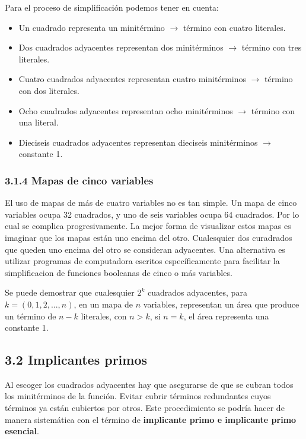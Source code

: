 \documentclass{article}
\begin{document}
Para el proceso de simplificaci\'{o}n podemos tener en cuenta: 
\begin{itemize}
    \item Un cuadrado representa un minit\'{e}rmino $\rightarrow$ t\'{e}rmino con cuatro literales.
    \item Dos cuadrados adyacentes representan dos minit\'{e}rminos $\rightarrow$ t\'{e}rmino con tres literales.
    \item Cuatro cuadrados adyacentes representan cuatro minit\'{e}rminos $\rightarrow$ t\'{e}rmino con dos literales.
    \item Ocho cuadrados adyacentes representan ocho minit\'{e}rminos $\rightarrow$ t\'{e}rmino con una literal.
    \item Dieciseis cuadrados adyacentes representan dieciseis minit\'{e}rminos $\rightarrow$ constante 1.
\end{itemize}

\subsubsection*{3.1.4 Mapas de cinco variables}
El uso de mapas de m\'{a}s de cuatro variables no es tan simple. Un mapa de cinco variables ocupa 32 cuadrados, y
uno de seis variables ocupa 64 cuadrados. Por lo cual se complica progresivamente. La mejor forma de visualizar estos
mapas es imaginar que los mapas est\'{a}n uno encima del otro. Cualesquier dos curadrados que queden uno encima del otro
se consideran adyacentes. Una alternativa es utilizar programas de computadora escritos espec\'{i}ficamente para facilitar
la simplificacion de funciones booleanas de cinco o m\'{a}s variables.

Se puede demostrar que cualesquier $2^k$ cuadrados adyacentes, para $k = (0, 1, 2, ..., n)$, en un mapa de $n$ variables,
representan un \'{a}rea que produce un t\'{e}rmino de $n - k$ literales, con $n > k$, si $n = k$, el \'{a}rea representa
una constante 1.

\subsection*{3.2 Implicantes primos}
Al escoger los cuadrados adyacentes hay que asegurarse de que se cubran todos los minit\'{e}rminos de la funci\'{o}n.
Evitar cubrir t\'{e}rminos redundantes cuyos t\'{e}rminos ya est\'{a}n cubiertos por otros. Este procedimiento se podr\'{i}a
hacer de manera sistem\'{a}tica con el t\'{e}rmino de \textbf{implicante primo e implicante primo esencial}.
\end{document}
